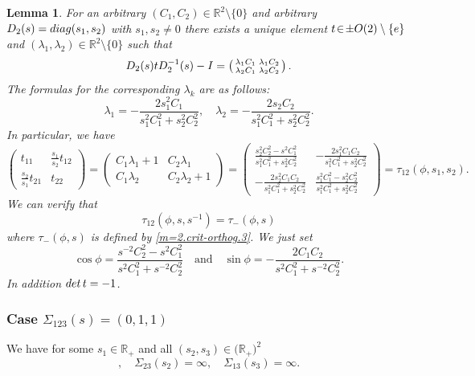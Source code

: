 \documentclass[preprint,12pt]{elsarticle}
\newtheorem{lem}[thm]{Lemma}
\numberwithin{equation}{section}
\begin{document}
\begin{lem}
\label{l.DtD=C.2}
For an arbitrary $(C_1,C_2)\in {\mathbb R}^2\setminus\{0\}$ and arbitrary $D_2(s)={\rm diag}(s_1,s_2)$ with $s_1,s_2\not=0$
there exists a unique  element $t\!\in \!\pm {\rm O}(2)\setminus\{e\}$  and $(\lambda_1,\lambda_2)\in {\mathbb R}^2\setminus\{0\}$
such that 
\begin{equation}
\label{D_2tD^{-1}_2=...}
D_2(s)tD^{-1}_2(s)-{\rm I}=\left(\begin{smallmatrix}
\lambda_1C_1 &\lambda_1C_2 \\
\lambda_2C_1 &\lambda_2C_2 
\end{smallmatrix}
\right).
\end{equation}
The formulas for the corresponding $\lambda_k$ are as follows:
\begin{equation}
 \label{lambda.2}
 \lambda_1=-\frac{2s_1^2C_1}{s_1^2C^2_1+s_2^2C^2_2},\quad \lambda_2=-\frac{2s_2C_2}{s_1^2C^2_1+s_2^2C^2_2}.
\end{equation}
%
In particular, we have
\begin{equation*}
 \left(\begin{smallmatrix}
 t_{11}&  \frac{s_1}{s_2}t_{12}\\  
\frac{s_2}{s_1}t_{21}&  t_{22}  
        \end{smallmatrix}\right)=
\left(\begin{smallmatrix}
C_1\lambda_1+1& 
C_2\lambda_1\\  
 C_1\lambda_2&C_2\lambda_2+1  
        \end{smallmatrix}\right)=
\left(\begin{smallmatrix} 
 \frac{s_2^2C^2_2-s^2C^2_1}{s_1^2C^2_1+s_2^2C^2_2}&  -\frac{2s_1^2C_1C_2}
 {s_1^2C^2_1+s_2^2C^2_2} \\    
 -\frac{2s_2^2C_1C_2}{s_1^2C^2_1+s_2^2C^2_2} & \frac{s_1^2C^2_1-s_2^2C^2_2}{s_1^2C^2_1+s_2^2C^2_2}   
 \end{smallmatrix}\right)=\tau_{12}(\phi,s_1,s_2).      
\end{equation*}
We can verify that 
$$\tau_{12}(\phi,s,s^{-1})=\tau_-(\phi,s)$$
where $\tau_-(\phi,s)$ is  defined by \eqref{m=2.crit-orthog.3}.
We just set $$\cos\phi=\frac{s^{-2}C^2_2-s^2C^2_1}{s^2C^2_1+s^{-2}C^2_2}\quad\text{and}\quad 
\sin\phi=-\frac{2C_1C_2}{s^2C^2_1+s^{-2}C^2_2}.$$
In addition ${\rm det}\,t=-1$.
\end{lem}
%
\subsubsection{Case $\Sigma_{123}(s)=(0,1,1)$}
We have for some $s_1\in  \mathbb R_+$ and all 
$(s_2,s_3)\in  \big(\mathbb R_+\big)^2$
$$,\quad \Sigma_{23}(s_2)=\infty,\quad\Sigma_{13}(s_3)=\infty.
$$
\end{document}
